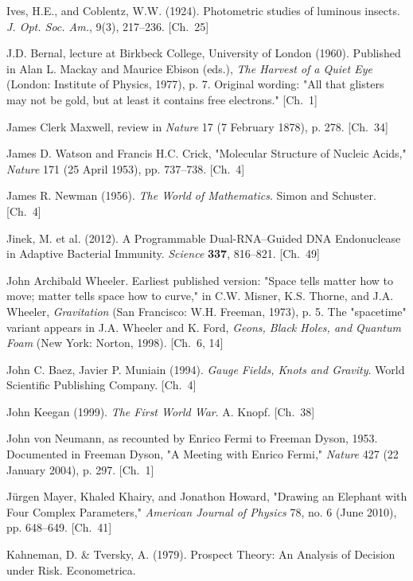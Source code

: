 \begin{list}{}{%
  \setlength{\leftmargin}{2em}%
  \setlength{\itemindent}{-2em}%
  \setlength{\itemsep}{0.35\baselineskip}%
  \setlength{\parsep}{0pt}%
  \setlength{\topsep}{0.5em}}
\item Ives, H.E., and Coblentz, W.W. (1924). Photometric studies of luminous insects. \textit{J. Opt. Soc. Am.}, 9(3), 217–236. \hfill {\scriptsize [Ch.~25]}
\item J.D. Bernal, lecture at Birkbeck College, University of London (1960). Published in Alan L. Mackay and Maurice Ebison (eds.), \textit{The Harvest of a Quiet Eye} (London: Institute of Physics, 1977), p. 7. Original wording: "All that glisters may not be gold, but at least it contains free electrons." \hfill {\scriptsize [Ch.~1]}
\item James Clerk Maxwell, review in \textit{Nature} 17 (7 February 1878), p. 278. \hfill {\scriptsize [Ch.~34]}
\item James D. Watson and Francis H.C. Crick, "Molecular Structure of Nucleic Acids," \textit{Nature} 171 (25 April 1953), pp. 737–738. \hfill {\scriptsize [Ch.~4]}
\item James R. Newman (1956). \textit{The World of Mathematics}. Simon and Schuster. \hfill {\scriptsize [Ch.~4]}
\item Jinek, M. et al. (2012). A Programmable Dual-RNA–Guided DNA Endonuclease in Adaptive Bacterial Immunity. \textit{Science} \textbf{337}, 816–821. \hfill {\scriptsize [Ch.~49]}
\item John Archibald Wheeler. Earliest published version: "Space tells matter how to move; matter tells space how to curve," in C.W. Misner, K.S. Thorne, and J.A. Wheeler, \textit{Gravitation} (San Francisco: W.H. Freeman, 1973), p. 5. The "spacetime" variant appears in J.A. Wheeler and K. Ford, \textit{Geons, Black Holes, and Quantum Foam} (New York: Norton, 1998). \hfill {\scriptsize [Ch.~6, 14]}
\item John C. Baez, Javier P. Muniain (1994). \textit{Gauge Fields, Knots and Gravity}. World Scientific Publishing Company. \hfill {\scriptsize [Ch.~4]}
\item John Keegan (1999). \textit{The First World War}. A. Knopf. \hfill {\scriptsize [Ch.~38]}
\item John von Neumann, as recounted by Enrico Fermi to Freeman Dyson, 1953. Documented in Freeman Dyson, "A Meeting with Enrico Fermi," \textit{Nature} 427 (22 January 2004), p. 297. \hfill {\scriptsize [Ch.~1]}
\item Jürgen Mayer, Khaled Khairy, and Jonathon Howard, "Drawing an Elephant with Four Complex Parameters," \textit{American Journal of Physics} 78, no. 6 (June 2010), pp. 648–649. \hfill {\scriptsize [Ch.~41]}
\item Kahneman, D. \& Tversky, A. (1979). Prospect Theory: An Analysis of Decision under Risk. Econometrica.

\end{list}
